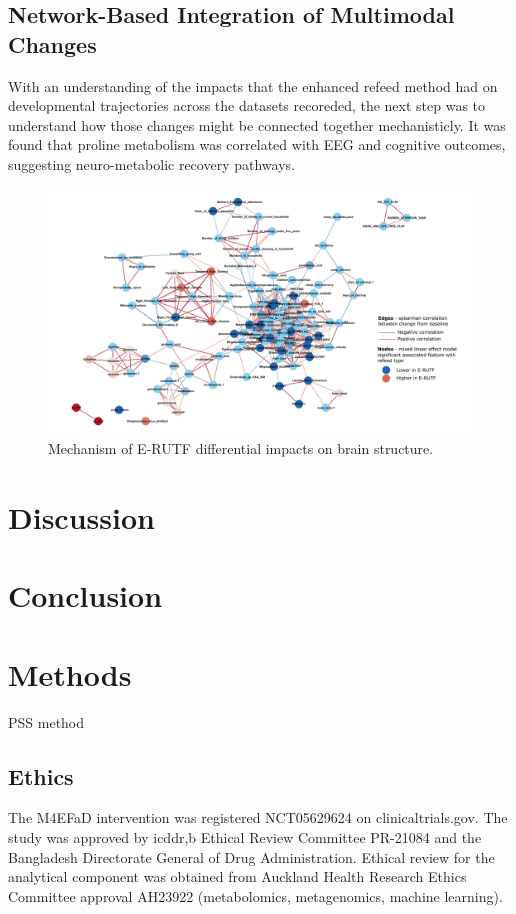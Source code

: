 \documentclass{article}
\begin{document}
\subsection*{Network-Based Integration of Multimodal Changes}
With an understanding of the impacts that the enhanced refeed method had on developmental trajectories across the datasets recoreded, the next step was to understand how those changes might be connected together mechanisticly.
It was found that proline metabolism was correlated with EEG and cognitive outcomes, suggesting neuro-metabolic recovery pathways.
\begin{figure}[H]
\centering
\includegraphics[scale=0.5]{../../figures/mixedmodelnetwork.pdf}
	\caption[Mechanism of E-RUTF differential impacts on brain structure]{
		Mechanism of E-RUTF differential impacts on brain structure.
	}
\label{Figure4}
\end{figure}

\section*{Discussion}

\section*{Conclusion}

\section*{Methods}
PSS method \cite{mozumder2022reliability}
\subsection*{Ethics}
The M4EFaD intervention was registered NCT05629624 on clinicaltrials.gov.
The study was approved by icddr,b Ethical Review Committee PR-21084 and the Bangladesh Directorate General of Drug Administration.
Ethical review for the analytical component was obtained from Auckland Health Research Ethics Committee approval AH23922 (metabolomics, metagenomics, machine learning).
\end{document}
